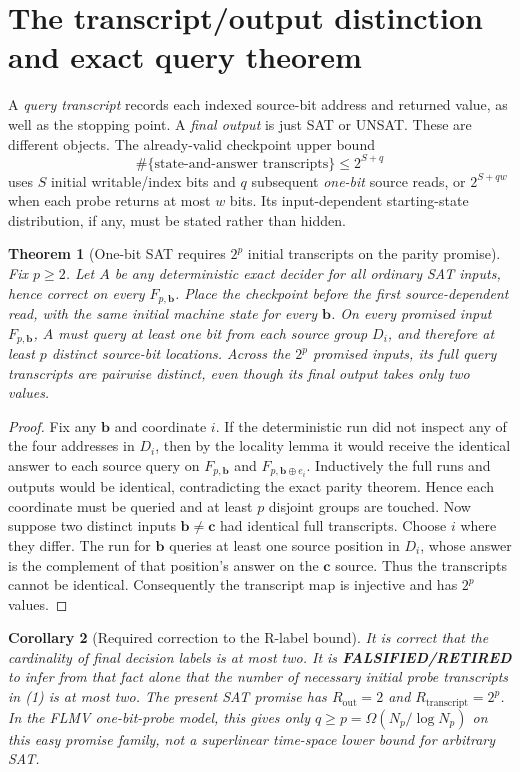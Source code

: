 \documentclass[11pt]{article}
\newtheorem{theorem}{Theorem}
\newtheorem{corollary}[theorem]{Corollary}
\begin{document}
\section{The transcript/output distinction and exact query theorem}
A \emph{query transcript} records each indexed source-bit address and returned value, as well as the stopping point. A \emph{final output} is just SAT or UNSAT. These are different objects. The already-valid checkpoint upper bound
\[
\#\{\text{state-and-answer transcripts}\}\le2^{S+q}
\tag{1}
\]
uses $S$ initial writable/index bits and $q$ subsequent \emph{one-bit} source reads, or $2^{S+qw}$ when each probe returns at most $w$ bits. Its input-dependent starting-state distribution, if any, must be stated rather than hidden.

\begin{theorem}[One-bit SAT requires $2^p$ initial transcripts on the parity promise]
Fix $p\ge2$. Let $A$ be \emph{any} deterministic exact decider for all ordinary SAT inputs, hence correct on every $F_{p,\mathbf b}$. Place the checkpoint before the first source-dependent read, with the same initial machine state for every $\mathbf b$. On \emph{every} promised input $F_{p,\mathbf b}$, $A$ must query at least one bit from each source group $D_i$, and therefore at least $p$ distinct source-bit locations. Across the $2^p$ promised inputs, its full query transcripts are pairwise distinct, even though its final output takes only two values.
\end{theorem}
\begin{proof}
Fix any $\mathbf b$ and coordinate $i$. If the deterministic run did not inspect any of the four addresses in $D_i$, then by the locality lemma it would receive the identical answer to each source query on $F_{p,\mathbf b}$ and $F_{p,\mathbf b\oplus e_i}$. Inductively the full runs and outputs would be identical, contradicting the exact parity theorem. Hence each coordinate must be queried and at least $p$ disjoint groups are touched. Now suppose two distinct inputs $\mathbf b\ne\mathbf c$ had identical full transcripts. Choose $i$ where they differ. The run for $\mathbf b$ queries at least one source position in $D_i$, whose answer is the complement of that position's answer on the $\mathbf c$ source. Thus the transcripts cannot be identical. Consequently the transcript map is injective and has $2^p$ values.
\end{proof}

\begin{corollary}[Required correction to the R-label bound]
It is correct that the cardinality of \emph{final decision labels} is at most two. It is \textbf{FALSIFIED/RETIRED} to infer from that fact alone that the number of necessary \emph{initial probe transcripts} in (1) is at most two. The present SAT promise has $R_{\mathrm{out}}=2$ and $R_{\mathrm{transcript}}=2^p$. In the FLMV one-bit-probe model, this gives only $q\ge p=\Omega(N_p/\log N_p)$ on this easy promise family, not a superlinear time-space lower bound for arbitrary SAT.
\end{corollary}
\end{document}
